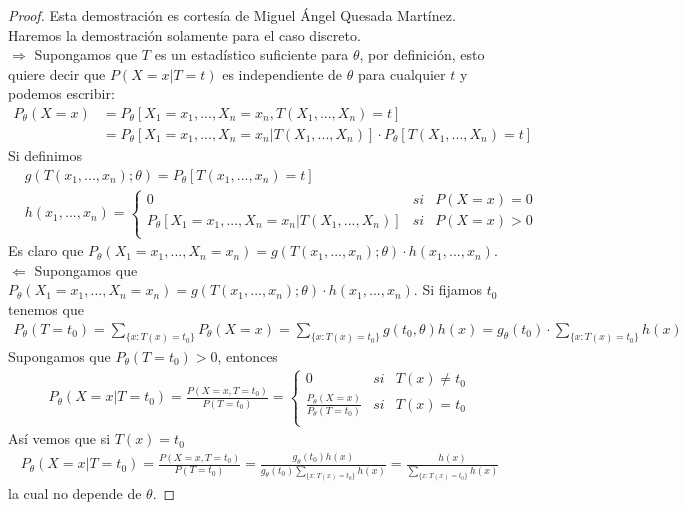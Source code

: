 \begin{proof}
Esta demostración es cortesía de Miguel Ángel Quesada Martínez. Haremos la demostración solamente para el caso discreto.
\\
\newline 
$\boxed{\Longrightarrow}$ Supongamos que $T$ es un estadístico suficiente para $\theta$, por definición, esto quiere decir que $P(X = x | T = t)$ es independiente de $\theta$ para cualquier $t$ y podemos escribir:
\begin{align*}
    P_{\theta}(X = x) &= P_{\theta}[X_1 = x_1,...,X_n = x_n , T(X_1,...,X_n) = t] \\
    & = P_{\theta}[X_1 = x_1,...,X_n = x_n | T(X_1,...,X_n)]  \cdot P_{\theta}[ T(X_1,...,X_n) = t]
\end{align*}
Si definimos
\begin{align*}
    &g(T(x_1,...,x_n);\theta) = P_{\theta}[T(x_1,...,x_n) = t] \\
    &h(x_1,...,x_n) = \left\{ \begin{array}{lcc}
             0 &  si  &  P(X = x) = 0\\
             P_{\theta}[X_1 = x_1,...,X_n = x_n | T(X_1,...,X_n)] &  si & P(X = x) > 0\\
             \end{array}
   \right.
\end{align*}
Es claro que $P_{\theta}(X_1 = x_1,...,X_n = x_n) = g(T(x_1,...,x_n);\theta) \cdot h(x_1,...,x_n)$.
\\
\newline
$\boxed{\Longleftarrow}$ Supongamos que $P_{\theta}(X_1 = x_1,...,X_n = x_n) = g(T(x_1,...,x_n);\theta) \cdot h(x_1,...,x_n)$. Si fijamos $t_0$ tenemos que
\begin{align*}
    P_{\theta}(T = t_0) = \sum_{\{x : T(x) = t_0\}}{P_{\theta}(X = x)} = \sum_{\{x : T(x) = t_0\}}{g(t_0,\theta)h(x)} = g_{\theta}(t_0) \cdot \sum_{\{x : T(x) = t_0\}}{h(x)}
\end{align*}
Supongamos que $P_{\theta}(T = t_0) > 0$, entonces
\begin{align*}
    P_{\theta}(X = x | T = t_0) = \frac{P(X = x, T = t_0)}{P(T = t_0)} = \left\{ \begin{array}{lcc}
             0 &  si  &  T(x) \not = t_0\\
             \frac{P_{\theta}(X = x)}{P_{\theta}(T = t_0)} &  si & T(x) = t_0 \\
             \end{array}
   \right.
\end{align*}
Así vemos que si $T(x) = t_0$
\begin{align*}
     P_{\theta}(X = x | T = t_0) = \frac{P(X = x, T = t_0)}{P(T = t_0)} = \frac{g_{\theta}(t_0)h(x)}{g_{\theta}(t_0)\sum_{\{x : T(x) = t_0\}}{h(x)}} = \frac{h(x)}{\sum_{\{x : T(x) = t_0\}}{h(x)}}
\end{align*}
la cual no depende de $\theta$.
\end{proof}


